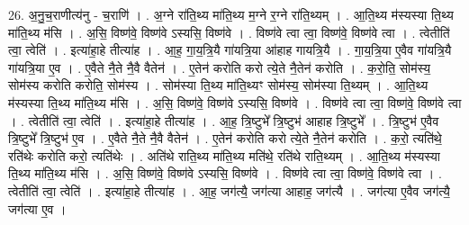 \documentclass[17pt]{extarticle}
\begin{document}
26. अ॒नु॒च॒राणीत्य॑नु - च॒राणि॑ । . अ॒ग्ने रा॑ति॒थ्य मा॑ति॒थ्य म॒ग्ने र॒ग्ने रा॑ति॒थ्यम् । . आ॒ति॒थ्य म॑स्यस्या ति॒थ्य मा॑ति॒थ्य म॑सि । . अ॒सि॒ विष्ण॑वे॒ विष्ण॑वे ऽस्यसि॒ विष्ण॑वे । . विष्ण॑वे त्वा त्वा॒ विष्ण॑वे॒ विष्ण॑वे त्वा । . त्वेतीति॑ त्वा॒ त्वेति॑ । . इत्या॑हा॒हे तीत्या॑ह । . आ॒ह॒ गा॒य॒त्रि॒यै गा॑यत्रि॒या आ॑हाह गायत्रि॒यै । . गा॒य॒त्रि॒या ए॒वैव गा॑यत्रि॒यै गा॑यत्रि॒या ए॒व । . ए॒वैते नै॒ते नै॒वै वैतेन॑ । . ए॒तेन॑ करोति करो त्ये॒ते नै॒तेन॑ करोति । . क॒रो॒ति॒ सोम॑स्य॒ सोम॑स्य करोति करोति॒ सोम॑स्य । . सोम॑स्या ति॒थ्य मा॑ति॒थ्यꣳ सोम॑स्य॒ सोम॑स्या ति॒थ्यम् । . आ॒ति॒थ्य म॑स्यस्या ति॒थ्य मा॑ति॒थ्य म॑सि । . अ॒सि॒ विष्ण॑वे॒ विष्ण॑वे ऽस्यसि॒ विष्ण॑वे । . विष्ण॑वे त्वा त्वा॒ विष्ण॑वे॒ विष्ण॑वे त्वा । . त्वेतीति॑ त्वा॒ त्वेति॑ । . इत्या॑हा॒हे तीत्या॑ह । . आ॒ह॒ त्रि॒ष्टुभे᳚ त्रि॒ष्टुभ॑ आहाह त्रि॒ष्टुभे᳚ । . त्रि॒ष्टुभ॑ ए॒वैव त्रि॒ष्टुभे᳚ त्रि॒ष्टुभ॑ ए॒व । . ए॒वैते नै॒ते नै॒वै वैतेन॑ । . ए॒तेन॑ करोति करो त्ये॒ते नै॒तेन॑ करोति । . क॒रो॒ त्यति॑थे॒ रति॑थेः करोति करो॒ त्यति॑थेः । . अति॑थे राति॒थ्य मा॑ति॒थ्य मति॑थे॒ रति॑थे राति॒थ्यम् । . आ॒ति॒थ्य म॑स्यस्या ति॒थ्य मा॑ति॒थ्य म॑सि । . अ॒सि॒ विष्ण॑वे॒ विष्ण॑वे ऽस्यसि॒ विष्ण॑वे । . विष्ण॑वे त्वा त्वा॒ विष्ण॑वे॒ विष्ण॑वे त्वा । . त्वेतीति॑ त्वा॒ त्वेति॑ । . इत्या॑हा॒हे तीत्या॑ह । . आ॒ह॒ जग॑त्यै॒ जग॑त्या आहाह॒ जग॑त्यै । . जग॑त्या ए॒वैव जग॑त्यै॒ जग॑त्या ए॒व । \newline
\end{document}
